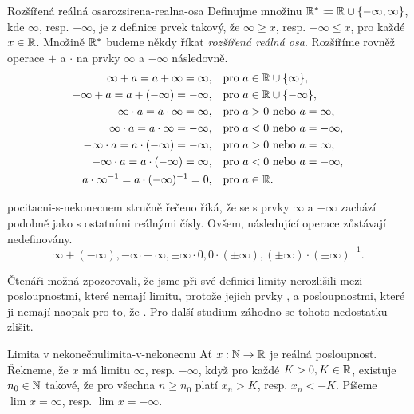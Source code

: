 \begin{definition}{Rozšířená reálná osa}{rozsirena-realna-osa}
 Definujme množinu $\mathbb{R}^{*} \coloneqq \mathbb{R} \cup \{-\infty,\infty\}$, kde $\infty$,
 resp. $-\infty$, je z definice prvek takový, že $\infty \geq x$, resp.
 $-\infty \leq x$, pro každé $x \in \mathbb{R}$. Množině $\mathbb{R}^{*}$ budeme někdy říkat
 \emph{rozšířená reálná osa}. Rozšíříme rovněž operace $+$ a $ \cdot $ na prvky
 $\infty$ a $-\infty$ následovně.
 \begin{align*}
  \infty + a = a + \infty = \infty,& \quad \text{pro }a \in \mathbb{R} \cup
  \{\infty\},\\
  -\infty + a = a + (-\infty) = -\infty,& \quad \text{pro }a \in \mathbb{R} \cup
  \{-\infty\},\\
  \infty \cdot a = a \cdot \infty = \infty,& \quad \text{pro }a > 0 \text{ nebo
  }a = \infty,\\
  \infty \cdot a = a \cdot \infty = -\infty,& \quad \text{pro }a < 0 \text{ nebo
  }a = -\infty,\\
  -\infty \cdot a = a \cdot (-\infty) = -\infty,& \quad \text{pro }a > 0 \text{
  nebo }a = \infty,\\
  -\infty \cdot a = a \cdot (-\infty) = \infty,& \quad \text{pro }a < 0 \text{
  nebo }a = -\infty,\\
  a \cdot \infty^{-1} = a \cdot (-\infty)^{-1} = 0,& \quad \text{pro }a \in \mathbb{R}.
 \end{align*}
\end{definition}

\begin{warning}{}{pocitacni-s-nekonecnem}
  stručně řečeno říká, že se s prvky
 $\infty$ a $-\infty$ zachází podobně jako s ostatními reálnými čísly. Ovšem,
 následující operace zůstávají nedefinovány.
 \[
  \infty + (-\infty), -\infty + \infty, \pm \infty \cdot 0, 0 \cdot ( \pm
  \infty), ( \pm \infty) \cdot ( \pm \infty)^{-1}.
 \]
\end{warning}

Čtenáři možná zpozorovali, že jsme při své
\hyperref[def:limita-posloupnosti]{definici limity} nerozlišili mezi
posloupnostmi, které nemají limitu, protože jejich prvky ,
a posloupnostmi, které ji nemají naopak pro to, že . Pro další studium záhodno se tohoto nedostatku zlišit.

\begin{definition}{Limita v nekonečnu}{limita-v-nekonecnu}
 Ať $x:\mathbb{N} \to \mathbb{R}$ je reálná posloupnost. Řekneme, že $x$ má limitu $\infty$,
 resp. $-\infty$, když pro každé $K > 0, K \in \mathbb{R}$, existuje $n_0 \in \mathbb{N}$
 takové, že pro všechna $n \geq n_0$ platí $x_n > K$, resp. $x_n < -K$. Píšeme
 $\lim_{} x = \infty$, resp. $\lim_{} x = -\infty$.
\end{definition}

